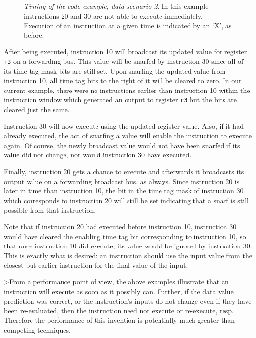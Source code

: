 \documentclass[10pt,dvips]{article}
\begin{document}
\begin{figure}
\centering
{}
\caption{{\em Timing of the code example, data scenario 2.}
In this example instructions 20 and 30 are not able to execute
immediately. Execution of an instruction at a given time is
indicated by an `X', as before.}
\label{ex2}
\end{figure}

After being executed, instruction 10 will broadcast 
its updated value for register
{\tt r3}
on a forwarding bus.
This value will be snarfed by instruction 30 since all of its
time tag mask bits are still set.  Upon snarfing the updated
value from instruction 10, all time tag bits to the right of
it will be cleared to zero.  In our current example, there
were no instructions earlier than instruction 10 within the instruction
window which generated an output to register
{\tt r3}
but the bits are cleared just the same.

Instruction 30 will now execute using the updated register value.
Also, if it had already executed, the act of snarfing a value will
enable the instruction to execute again.  Of course, the newly broadcast
value would not have been snarfed if its value did not change, nor would
instruction 30 have executed.

Finally, instruction 20 gets a chance to execute and afterwards it
broadcasts its output value on a forwarding broadcast bus, as always.
Since instruction 20 is later in time than instruction 10,
the bit in the time tag mask of instruction 30 which corresponds
to instruction 20 will still be set indicating that a snarf
is still possible from that instruction.

Note that if instruction 20 had executed before instruction 10,
instruction 30 would have cleared the enabling time tag bit
corresponding to instruction 10, so that once instruction 10
did execute, its value would be ignored by instruction 30. This
is exactly what is desired: an instruction should use the input
value from the closest but earlier instruction for the final
value of the input.

>From a performance point of view, the above examples illustrate that
an instruction will execute as soon as it possibly can. Further,
if the data value prediction was correct, or the instruction's
inputs do not
change even if they have been re-evaluated, then the instruction
need not execute or re-execute, resp. Therefore the performance of
this invention is potentially much greater than competing techniques.
\end{document}
